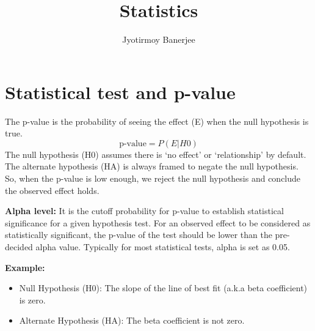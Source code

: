 \documentclass{article}
\title{Statistics}
\author{Jyotirmoy Banerjee}
\begin{document}
\maketitle

\section{Statistical test and p-value}
The p-value is the probability of seeing the effect (E) when the null hypothesis is true.
\[
\text{p-value} = P(E|H0)
\]
The null hypothesis (H0) assumes there is `no effect' or `relationship' by default. The alternate hypothesis (HA) is always framed to negate the null hypothesis. So, when the p-value is low enough, we reject the null hypothesis and conclude the observed effect holds.

\textbf{Alpha level:}
It is the cutoff probability for p-value to establish statistical significance for a given hypothesis test.
For an observed effect to be considered as statistically significant, the p-value of the test should be lower than the pre-decided alpha value.
Typically for most statistical tests, alpha is set as 0.05.

\textbf{Example:}
\begin{itemize}
\item Null Hypothesis (H0): The slope of the line of best fit (a.k.a beta coefficient) is zero.
\item Alternate Hypothesis (HA): The beta coefficient is not zero.
\end{itemize}
\end{document}
